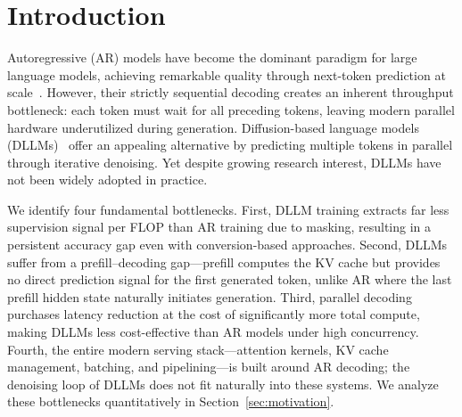 \section{Introduction}
\label{sec:intro}

Autoregressive (AR) models have become the dominant paradigm for large language models, achieving remarkable quality through next-token prediction at scale~\citep{qwen3, deepseekv3}. However, their strictly sequential decoding creates an inherent throughput bottleneck: each token must wait for all preceding tokens, leaving modern parallel hardware underutilized during generation. Diffusion-based language models (DLLMs)~\citep{austin2021d3pm, sahoo2024mdlm, nie2025llada} offer an appealing alternative by predicting multiple tokens in parallel through iterative denoising. Yet despite growing research interest, DLLMs have not been widely adopted in practice.

We identify four fundamental bottlenecks. First, DLLM training extracts far less supervision signal per FLOP than AR training due to masking, resulting in a persistent accuracy gap even with conversion-based approaches. Second, DLLMs suffer from a prefill--decoding gap---prefill computes the KV cache but provides no direct prediction signal for the first generated token, unlike AR where the last prefill hidden state naturally initiates generation. Third, parallel decoding purchases latency reduction at the cost of significantly more total compute, making DLLMs less cost-effective than AR models under high concurrency. Fourth, the entire modern serving stack---attention kernels, KV cache management, batching, and pipelining---is built around AR decoding; the denoising loop of DLLMs does not fit naturally into these systems. We analyze these bottlenecks quantitatively in Section~\ref{sec:motivation}.

